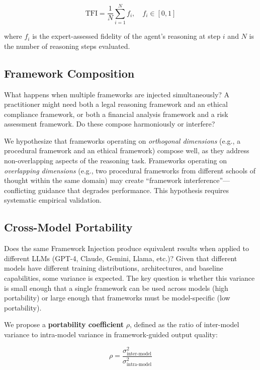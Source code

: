 \documentclass[12pt,a4paper]{article}
\begin{document}
\begin{equation}
\text{TFI} = \frac{1}{N} \sum_{i=1}^{N} f_i, \quad f_i \in [0,1]
\end{equation}

\noindent where $f_i$ is the expert-assessed fidelity of the agent's reasoning at step $i$ and $N$ is the number of reasoning steps evaluated.

\subsection{Framework Composition}
\label{sec:future:composition}

What happens when multiple frameworks are injected simultaneously? A practitioner might need both a legal reasoning framework and an ethical compliance framework, or both a financial analysis framework and a risk assessment framework. Do these compose harmoniously or interfere?

We hypothesize that frameworks operating on \emph{orthogonal dimensions} (e.g., a procedural framework and an ethical framework) compose well, as they address non-overlapping aspects of the reasoning task. Frameworks operating on \emph{overlapping dimensions} (e.g., two procedural frameworks from different schools of thought within the same domain) may create ``framework interference''---conflicting guidance that degrades performance. This hypothesis requires systematic empirical validation.

\subsection{Cross-Model Portability}
\label{sec:future:portability}

Does the same Framework Injection produce equivalent results when applied to different LLMs (GPT-4, Claude, Gemini, Llama, etc.)? Given that different models have different training distributions, architectures, and baseline capabilities, some variance is expected. The key question is whether this variance is small enough that a single framework can be used across models (high portability) or large enough that frameworks must be model-specific (low portability).

We propose a \textbf{portability coefficient} $\rho$, defined as the ratio of inter-model variance to intra-model variance in framework-guided output quality:

\begin{equation}
\rho = \frac{\sigma^2_{\text{inter-model}}}{\sigma^2_{\text{intra-model}}}
\end{equation}
\end{document}
